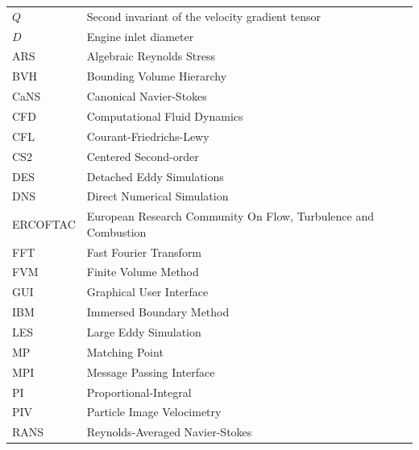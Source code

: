 \documentclass[12pt, a4paper, twoside, openright]{book}
\begin{document}
\begin{longtable}{p{} p{}}
	\addlinespace
	\addlinespace
	$Q$											 & Second invariant of the velocity gradient tensor \\
	$D$											 & Engine inlet diameter\\

    \addlinespace
	\addlinespace
	ARS											 & Algebraic Reynolds Stress\\
    BVH                                          & Bounding Volume Hierarchy\\
	CaNS										 & Canonical Navier-Stokes\\
    CFD                                          & Computational Fluid Dynamics                                          \\
    CFL                                          & Courant-Friedrichs-Lewy\\
    CS2                                          & Centered Second-order\\
	DES											 & Detached Eddy Simulations\\
    DNS                                          & Direct Numerical Simulation                                           \\
    ERCOFTAC                                     & European Research Community On Flow, Turbulence and Combustion \\
    FFT                                          & Fast Fourier Transform\\
    FVM                                          & Finite Volume Method\\
    GUI                                          & Graphical User Interface\\
    IBM                                          & Immersed Boundary Method                                              \\
    LES                                          & Large Eddy Simulation                                                 \\
    MP                                           & Matching Point\\
    MPI                                          & Message Passing Interface\\
    PI                                           & Proportional-Integral\\
    PIV                                          & Particle Image Velocimetry\\
    RANS                                         & Reynolds-Averaged Navier-Stokes                                       \\

\end{longtable}
\end{document}
